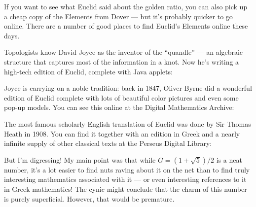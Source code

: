 \documentclass{article}
\def\tightlist{}
\renewcommand{\texttt}[1]{%
  \begingroup
  \ttfamily
  \begingroup\lccode`~=`/\lowercase{\endgroup\def~}{/\discretionary{}{}{}}%
  \begingroup\lccode`~=`[\lowercase{\endgroup\def~}{[\discretionary{}{}{}}%
  \begingroup\lccode`~=`.\lowercase{\endgroup\def~}{.\discretionary{}{}{}}%
  \catcode`/=\active\catcode`[=\active\catcode`.=\active
  \scantokens{#1\noexpand}%
  \endgroup
}
\begin{document}
If you want to see what Euclid said about the golden ratio, you can also
pick up a cheap copy of the Elements from Dover --- but it's probably
quicker to go online. There are a number of good places to find Euclid's
Elements online these days.

Topologists know David Joyce as the inventor of the ``quandle'' --- an
algebraic structure that captures most of the information in a knot. Now
he's writing a high-tech edition of Euclid, complete with Java applets:


Joyce is carrying on a noble tradition: back in 1847, Oliver Byrne did a
wonderful edition of Euclid complete with lots of beautiful color
pictures and even some pop-up models. You can see this online at the
Digital Mathematics Archive:


The most famous scholarly English translation of Euclid was done by Sir
Thomas Heath in 1908. You can find it together with an edition in Greek
and a nearly infinite supply of other classical texts at the Perseus
Digital Library:


But I'm digressing! My main point was that while
\(G = (1 + \sqrt{5})/2\) is a neat number, it's a lot easier to find
nuts raving about it on the net than to find truly interesting
mathematics associated with it --- or even interesting references to it
in Greek mathematics! The cynic might conclude that the charm of this
number is purely superficial. However, that would be premature.
\end{document}
